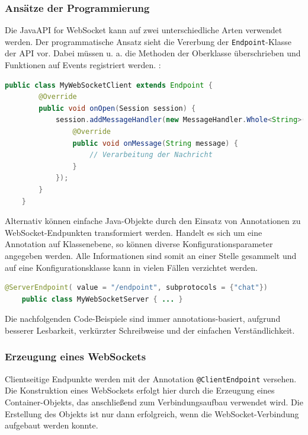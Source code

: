 \documentclass[11pt,a4paper,titlepage]{scrartcl}
\numberwithin{equation}{section}
\begin{document}
\subsubsection*{Ansätze der Programmierung}
Die Java\texttrademark API for WebSocket kann auf zwei unterschiedliche Arten verwendet werden. Der programmatische Ansatz sieht die Vererbung der \texttt{Endpoint}-Klasse der API vor. Dabei müssen u. a. die Methoden der Oberklasse überschrieben und Funktionen auf Events registriert werden. \autocite[9]{coward_java_2014}:\smallskip

\begin{lstlisting}[frame=single, language=Java, caption=Java: programmatischer Ansatz]
	public class MyWebSocketClient extends Endpoint {
		@Override
		public void onOpen(Session session) {
			session.addMessageHandler(new MessageHandler.Whole<String>() {
				@Override
				public void onMessage(String message) {
					// Verarbeitung der Nachricht
				}
			});
		}
	}
\end{lstlisting}

\noindent Alternativ können einfache Java-Objekte durch den Einsatz von Annotationen zu WebSocket-Endpunkten transformiert werden. Handelt es sich um eine Annotation auf Klassenebene, so können diverse Konfigurationsparameter angegeben werden. Alle Informationen sind somit an einer Stelle gesammelt und auf eine Konfigurationsklasse kann in vielen Fällen verzichtet werden.\medskip

\begin{lstlisting}[frame=single, language=Java, caption=Java: Annotationen,label=lst:ServerAnnotation]
	@ServerEndpoint( value = "/endpoint", subprotocols = {"chat"})
	public class MyWebSocketServer { ... }
\end{lstlisting}

\noindent Die nachfolgenden Code-Beispiele sind immer annotations-basiert, aufgrund besserer Lesbarkeit, verkürzter Schreibweise und der einfachen Verständlichkeit. \vspace{-3mm}

\subsubsection*{Erzeugung eines WebSockets}
Clientseitige Endpunkte werden mit der Annotation \texttt{@ClientEndpoint} versehen. Die Konstruktion eines WebSockets erfolgt hier durch die Erzeugung eines Container-Objekts, das anschließend zum Verbindungsaufbau verwendet wird. Die Erstellung des Objekts ist nur dann erfolgreich, wenn die WebSocket-Verbindung aufgebaut werden konnte. \medskip
\end{document}
